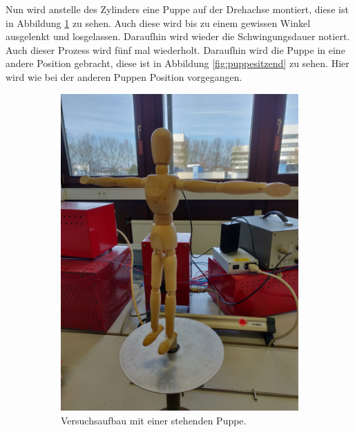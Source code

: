 \FloatBarrier
Nun wird anstelle des Zylinders eine Puppe auf der Drehachse montiert, diese ist in Abbildung \ref{fig:puppetpose} zu sehen.
Auch diese wird bis zu einem gewissen Winkel ausgelenkt und losgelassen.
Daraufhin wird wieder die Schwingungsdauer notiert.
Auch dieser Prozess wird fünf mal wiederholt.
Daraufhin wird die Puppe in eine andere Position gebracht, diese ist in Abbildung \ref{fig:puppesitzend} zu sehen.
Hier wird wie bei der anderen Puppen Position vorgegangen.

\begin{figure}
\centering
\begin{subfigure}{0.5\textwidth}
    \centering
    \includegraphics[scale=0.1]{content/data/PuppeTPose2.png}
    \caption{Versuchsaufbau mit einer stehenden Puppe.}
    \label{fig:puppetpose}
\end{subfigure}%
\begin{subfigure}{0.5\textwidth}
    \centering

\end{subfigure}
\end{figure}

